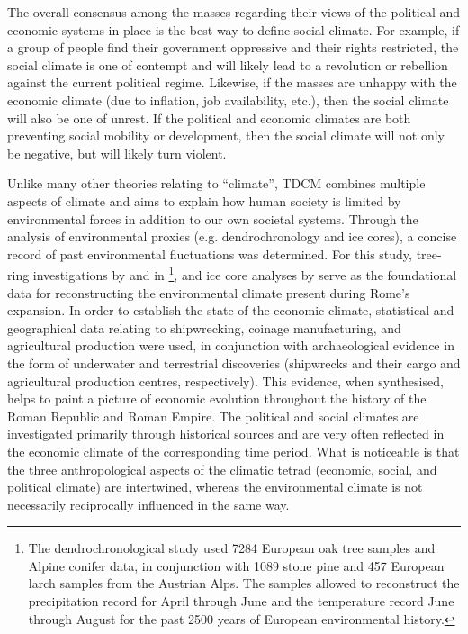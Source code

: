 The overall consensus among the masses regarding their views of the political and economic systems in place is the best way to define social climate. For example, if a group of people find their government oppressive and their rights restricted, the social climate is one of contempt and will likely lead to a revolution or rebellion against the current political regime. Likewise, if the masses are unhappy with the economic climate (due to inflation, job availability, etc.), then the social climate will also be one of unrest. If the political and economic climates are both preventing social mobility or development, then the social climate will not only be negative, but will likely turn violent.

Unlike many other theories relating to “climate”, TDCM combines multiple aspects of climate and aims to explain how human society is limited by environmental forces in addition to our own societal systems. Through the analysis of environmental proxies (e.g. dendrochronology and ice cores), a concise record of past environmental fluctuations was determined. For this study, tree-ring investigations by \textcite{Büntgen_2011a} and in \textcite{Büntgen_2011b}\footnote{The dendrochronological study used 
\num{7284} European oak tree samples and Alpine conifer data, in conjunction with \num{1089} stone pine and \num{457} European larch samples from the Austrian Alps. 
The samples allowed \textcite{Büntgen_2011a} to reconstruct the precipitation record for April through June and the temperature record June through August for the past 2500 years of European environmental history.}, and ice core analyses by \textcite{McCormick_2012} serve as the foundational data for reconstructing the environmental climate present during Rome’s expansion. In order to establish the state of the economic climate, statistical and geographical data relating to shipwrecking, coinage manufacturing, and agricultural production were used, in conjunction with archaeological evidence in the form of underwater and terrestrial discoveries (shipwrecks and their cargo and agricultural production centres, respectively). This evidence, when synthesised, helps to paint a picture of economic evolution throughout the history of the Roman Republic and Roman Empire. The political and social climates are investigated primarily through historical sources and are very often reflected in the economic climate of the corresponding time period. What is noticeable is that the three anthropological aspects of the climatic tetrad (economic, social, and political climate) are intertwined, whereas the environmental climate is not necessarily reciprocally influenced in the same way.

